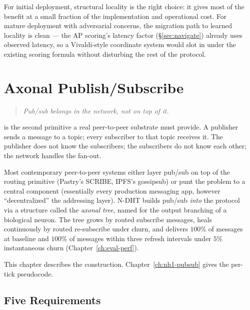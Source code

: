 \documentclass[twoside,nobib]{tufte-book}
\newcommand{\NDHT}{N-DHT\xspace}
\begin{document}
For initial deployment, structural locality is the right choice:
it gives most of the benefit at a small fraction of the
implementation and operational cost. For mature deployment with
adversarial concerns, the migration path to learned locality is
clean --- the AP scoring's latency factor (\S\ref{sec:navigate})
already uses observed latency, so a Vivaldi-style coordinate
system would slot in under the existing scoring formula without
disturbing the rest of the protocol.


\chapter{Axonal Publish/Subscribe}
\label{ch:pubsub}

\begin{quote}
  \itshape Pub/sub belongs in the network, not on top of it.
\end{quote}

 is the second primitive a real
peer-to-peer substrate must provide. A publisher sends a message
to a topic; every subscriber to that topic receives it. The
publisher does not know the subscribers; the subscribers do not
know each other; the network handles the fan-out.

Most contemporary peer-to-peer systems either layer pub/sub on
top of the routing primitive (Pastry's SCRIBE, IPFS's gossipsub)
or punt the problem to a central component (essentially every
production messaging app, however ``decentralized'' the
addressing layer). \NDHT builds pub/sub \emph{into} the protocol
via a structure called the \emph{axonal tree}, named for the
output branching of a biological neuron. The tree grows by
routed subscribe messages, heals continuously by routed
re-subscribe under churn, and delivers $100\%$ of messages at
baseline and $100\%$ of messages within three refresh intervals
under $5\%$ instantaneous churn (Chapter~\ref{ch:eval-perf}).

This chapter describes the construction. Chapter~\ref{ch:nh1-pubsub}
gives the per-tick pseudocode.

\section{Five Requirements}
\end{document}
